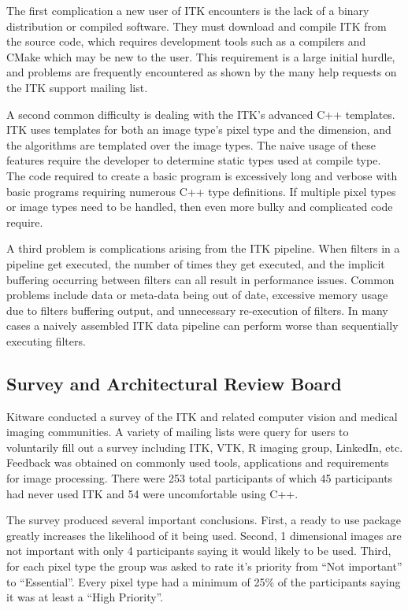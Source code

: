 \documentclass{frontiersMED} %
\begin{document}
The first complication a new user of ITK encounters is the lack of a
binary distribution or compiled software. They must download and
compile ITK from the source code, which requires development tools
such as a compilers and CMake which may be new to the user. This
requirement is a large initial hurdle, and problems are frequently
encountered as shown by the many help requests on the ITK support
mailing list.

A second common difficulty is dealing with the ITK's advanced C++
templates. ITK uses templates for both an image type's pixel type and
the dimension, and the algorithms are templated over the image
types. The naive usage of these features require the developer to
determine static types used at compile type.  The code required to
create a basic program is excessively long and verbose with basic
programs requiring numerous C++ type definitions.  If multiple pixel
types or image types need to be handled, then even more bulky and
complicated code require.

A third problem is complications arising from the ITK pipeline. When
filters in a pipeline get executed, the number of times they get
executed, and the implicit buffering occurring between filters can all
result in performance issues. Common problems include data or
meta-data being out of date, excessive memory usage due to filters
buffering output, and unnecessary re-execution of filters. In many
cases a naively assembled ITK data pipeline can perform worse than
sequentially executing filters.


\subsection {Survey and Architectural Review Board}
Kitware conducted a survey of the ITK and related computer vision and
medical imaging communities. A variety of mailing lists were query for
users to voluntarily fill out a survey including ITK, VTK, R imaging
group, LinkedIn, etc. Feedback was obtained on commonly used tools,
applications and requirements for image processing. There were 253
total participants of which 45 participants had never used ITK and 54
were uncomfortable using C++.

The survey produced several important conclusions. First, a ready to
use package greatly increases the likelihood of it being used. Second,
1 dimensional images are not important with only 4 participants saying
it would likely to be used. Third, for each pixel type the group was
asked to rate it's priority from ``Not important'' to ``Essential''. Every
pixel type had a minimum of 25\% of the participants saying it was at least
a ``High Priority''.
\end{document}
